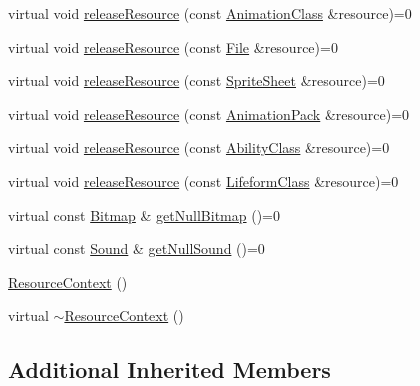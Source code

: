 \begin{DoxyCompactItemize}
virtual void \hyperlink{classZeta_1_1ResourceContext_a340b915daf48c6e16290bd702e35d092}{release\+Resource} (const \hyperlink{classZeta_1_1AnimationClass}{Animation\+Class} \&resource)=0
\item 
virtual void \hyperlink{classZeta_1_1ResourceContext_afa0b03c9c8fde0d11cf989c60cc142cf}{release\+Resource} (const \hyperlink{classZeta_1_1File}{File} \&resource)=0
\item 
virtual void \hyperlink{classZeta_1_1ResourceContext_a46f859918df3ec32d57e82d442fd3d12}{release\+Resource} (const \hyperlink{classZeta_1_1SpriteSheet}{Sprite\+Sheet} \&resource)=0
\item 
virtual void \hyperlink{classZeta_1_1ResourceContext_acd0f23e14c8195682b0978abb4833e2c}{release\+Resource} (const \hyperlink{classZeta_1_1AnimationPack}{Animation\+Pack} \&resource)=0
\item 
virtual void \hyperlink{classZeta_1_1ResourceContext_ac50cf4bf7e2be1d2a61673d69bd6a2e7}{release\+Resource} (const \hyperlink{classZeta_1_1AbilityClass}{Ability\+Class} \&resource)=0
\item 
virtual void \hyperlink{classZeta_1_1ResourceContext_a04b09ec9b7d07ac30def909e469a29ec}{release\+Resource} (const \hyperlink{classZeta_1_1LifeformClass}{Lifeform\+Class} \&resource)=0
\item 
virtual const \hyperlink{classZeta_1_1Bitmap}{Bitmap} \& \hyperlink{classZeta_1_1ResourceContext_a995fd748b85a3157b38bd3f6f1ad1043}{get\+Null\+Bitmap} ()=0
\item 
virtual const \hyperlink{classZeta_1_1Sound}{Sound} \& \hyperlink{classZeta_1_1ResourceContext_aa554f22a7babb913a3c574242480f0b8}{get\+Null\+Sound} ()=0
\item 
\hyperlink{classZeta_1_1ResourceContext_a26154e5b9866f9c2b6b1650bf311079a}{Resource\+Context} ()
\item 
virtual \hyperlink{classZeta_1_1ResourceContext_ad84b5a7dbb842168fc14e1808eab2a8b}{$\sim$\+Resource\+Context} ()
\end{DoxyCompactItemize}
\subsection*{Additional Inherited Members}


